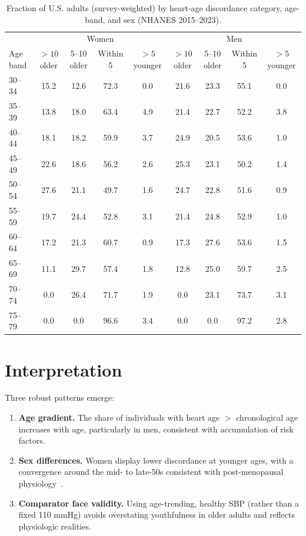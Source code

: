 \documentclass{article}
\begin{document}
\begin{table}
  \centering
  \caption{Fraction of U.S. adults (survey-weighted) by heart-age discordance category, age-band, and sex (NHANES 2015--2023).}
  \label{tab:discordance-fractions}
  \begin{tabular}{lcccccccc}
    \toprule
    & \multicolumn{4}{c}{Women} & \multicolumn{4}{c}{Men} \\
    \cmidrule(r){2-5} \cmidrule(r){6-9}
    Age band & $>10$ older & 5--10 older & Within 5 & $>5$ younger & $>10$ older & 5--10 older & Within 5 & $>5$ younger \\
    \midrule
    30--34 & 15.2 & 12.6 & 72.3 & 0.0 & 21.6 & 23.3 & 55.1 & 0.0 \\
    35--39 & 13.8 & 18.0 & 63.4 & 4.9 & 21.4 & 22.7 & 52.2 & 3.8 \\
    40--44 & 18.1 & 18.2 & 59.9 & 3.7 & 24.9 & 20.5 & 53.6 & 1.0 \\
    45--49 & 22.6 & 18.6 & 56.2 & 2.6 & 25.3 & 23.1 & 50.2 & 1.4 \\
    50--54 & 27.6 & 21.1 & 49.7 & 1.6 & 24.7 & 22.8 & 51.6 & 0.9 \\
    55--59 & 19.7 & 24.4 & 52.8 & 3.1 & 21.4 & 24.8 & 52.9 & 1.0 \\
    60--64 & 17.2 & 21.3 & 60.7 & 0.9 & 17.3 & 27.6 & 53.6 & 1.5 \\
    65--69 & 11.1 & 29.7 & 57.4 & 1.8 & 12.8 & 25.0 & 59.7 & 2.5 \\
    70--74 & 0.0 & 26.4 & 71.7 & 1.9 & 0.0 & 23.1 & 73.7 & 3.1 \\
    75--79 & 0.0 & 0.0 & 96.6 & 3.4 & 0.0 & 0.0 & 97.2 & 2.8 \\
    \bottomrule
  \end{tabular}
\end{table}

\section{Interpretation}
Three robust patterns emerge:
\begin{enumerate}
  \item \textbf{Age gradient.} The share of individuals with heart age $>$ chronological age increases with age, particularly in men, consistent with accumulation of risk factors.
  \item \textbf{Sex differences.} Women display lower discordance at younger ages, with a convergence around the mid- to late-50s consistent with post-menopausal physiology~\cite{ClevelandClinicMenopause}.
  \item \textbf{Comparator face validity.} Using age-trending, healthy SBP (rather than a fixed 110 mmHg) avoids overstating youthfulness in older adults and reflects physiologic realities.
\end{enumerate}
\end{document}
